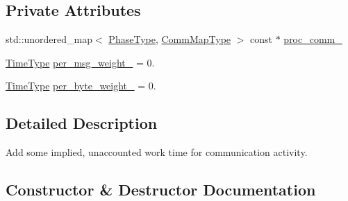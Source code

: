\subsection*{Private Attributes}
\begin{DoxyCompactItemize}
\item 
std\+::unordered\+\_\+map$<$ \hyperlink{namespacevt_a46ce6733d5cdbd735d561b7b4029f6d7}{Phase\+Type}, \hyperlink{namespacevt_1_1vrt_1_1collection_1_1balance_a10860c956804d644db54a16012352728}{Comm\+Map\+Type} $>$ const  $\ast$ \hyperlink{structvt_1_1vrt_1_1collection_1_1balance_1_1_comm_overhead_a6c5e0954d01ac8c05a44dfabdc053e0e}{proc\+\_\+comm\+\_\+}
\item 
\hyperlink{namespacevt_a876a9d0cd5a952859c72de8a46881442}{Time\+Type} \hyperlink{structvt_1_1vrt_1_1collection_1_1balance_1_1_comm_overhead_a5767b946ab89c461f3387825e8ef86df}{per\+\_\+msg\+\_\+weight\+\_\+} = 0.
\item 
\hyperlink{namespacevt_a876a9d0cd5a952859c72de8a46881442}{Time\+Type} \hyperlink{structvt_1_1vrt_1_1collection_1_1balance_1_1_comm_overhead_a35c4dcc20558f0f5092f9d5ab2e1a662}{per\+\_\+byte\+\_\+weight\+\_\+} = 0.
\end{DoxyCompactItemize}


\subsection{Detailed Description}
Add some implied, unaccounted work time for communication activity. 

\subsection{Constructor \& Destructor Documentation}
\mbox{\label{structvt_1_1vrt_1_1collection_1_1balance_1_1_comm_overhead_af918fee4ae0360d93c19442945e9c3d4}} 
